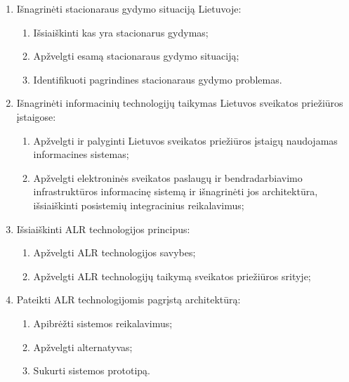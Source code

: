     \begin{enumerate}
        \item Išnagrinėti stacionaraus gydymo situaciją Lietuvoje:
        \begin{enumerate}
            \item Išsiaiškinti kas yra stacionarus gydymas;
            \item Apžvelgti esamą stacionaraus gydymo situaciją;
            \item Identifikuoti pagrindines stacionaraus gydymo problemas.
        \end{enumerate}
        \item Išnagrinėti informacinių technologijų taikymas Lietuvos sveikatos priežiūros įstaigose:
        \begin{enumerate}
            \item Apžvelgti ir palyginti Lietuvos sveikatos priežiūros įstaigų naudojamas informacines sistemas;
            \item Apžvelgti elektroninės sveikatos paslaugų ir bendradarbiavimo infrastruktūros informacinę sistemą ir išnagrinėti jos architektūra, išsiaiškinti posistemių integracinius reikalavimus;
        \end{enumerate}
        \item Išsiaiškinti ALR technologijos principus:
        \begin{enumerate}
            \item Apžvelgti ALR technologijos savybes;
            \item Apžvelgti ALR technologijų taikymą sveikatos priežiūros srityje;
        \end{enumerate}
        \item Pateikti ALR  technologijomis pagrįstą architektūrą:
        \begin{enumerate}
            \item Apibrėžti sistemos reikalavimus;
            \item Apžvelgti alternatyvas;
            \item Sukurti sistemos prototipą.
        \end{enumerate}
    \end{enumerate}

